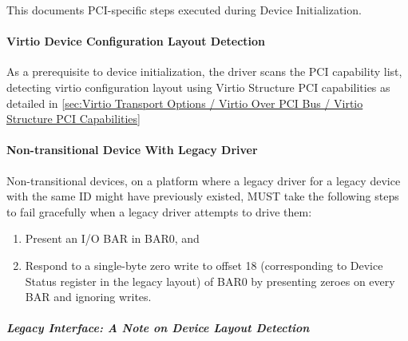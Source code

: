 This documents PCI-specific steps executed during Device Initialization.

\paragraph{Virtio Device Configuration Layout Detection}\label{sec:Virtio Transport Options / Virtio Over PCI Bus / PCI-specific Initialization And Device Operation / Device Initialization / Virtio Device Configuration Layout Detection}

As a prerequisite to device initialization, the driver scans the
PCI capability list, detecting virtio configuration layout using Virtio
Structure PCI capabilities as detailed in \ref{sec:Virtio Transport Options / Virtio Over PCI Bus / Virtio Structure PCI Capabilities}

\paragraph{Non-transitional Device With Legacy Driver}\label{sec:Virtio Transport Options / Virtio Over PCI Bus / PCI-specific Initialization And Device Operation / Device Initialization / Non-transitional Device With Legacy Driver}


Non-transitional devices, on a platform where a legacy driver for
a legacy device with the same ID might have previously existed,
MUST take the following steps to fail gracefully when a legacy
driver attempts to drive them:

\begin{enumerate}
\item Present an I/O BAR in BAR0, and
\item Respond to a single-byte zero write to offset 18
   (corresponding to Device Status register in the legacy layout)
   of BAR0 by presenting zeroes on every BAR and ignoring writes.
\end{enumerate}

\subparagraph{Legacy Interface: A Note on Device Layout Detection}\label{sec:Virtio Transport Options / Virtio Over PCI Bus / PCI-specific Initialization And Device Operation / Device Initialization / Virtio Device Configuration Layout Detection / Legacy Interface: A Note on Device Layout Detection}

